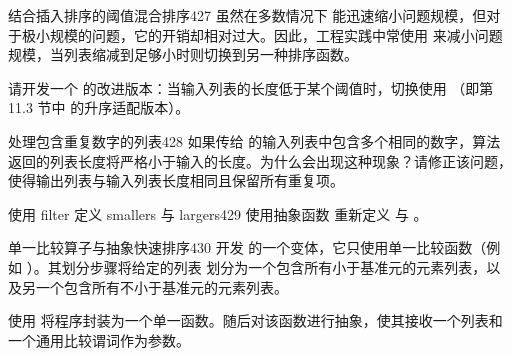\begin{exercise}{结合插入排序的阈值混合排序}{427}\label{ex:427}
虽然在多数情况下  能迅速缩小问题规模，但对于极小规模的问题，它的开销却相对过大。因此，工程实践中常使用  来减小问题规模，当列表缩减到足够小时则切换到另一种排序函数。

请开发一个  的改进版本：当输入列表的长度低于某个阈值时，切换使用 （即第 11.3 节中  的升序适配版本）。
\end{exercise}

\begin{exercise}{处理包含重复数字的列表}{428}\label{ex:428}
如果传给  的输入列表中包含多个相同的数字，算法返回的列表长度将严格小于输入的长度。为什么会出现这种现象？请修正该问题，使得输出列表与输入列表长度相同且保留所有重复项。
\end{exercise}

\begin{exercise}{使用 filter 定义 smallers 与 largers}{429}\label{ex:429}
使用抽象函数  重新定义  与 。
\end{exercise}

\begin{exercise}{单一比较算子与抽象快速排序}{430}\label{ex:430}
开发  的一个变体，它只使用单一比较函数（例如 \code{<}）。其划分步骤将给定的列表  划分为一个包含所有小于基准元的元素列表，以及另一个包含所有不小于基准元的元素列表。

使用  将程序封装为一个单一函数。随后对该函数进行抽象，使其接收一个列表和一个通用比较谓词作为参数。
\end{exercise}
